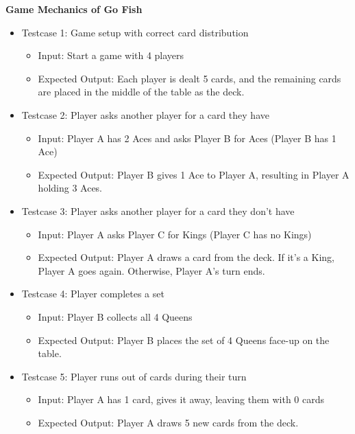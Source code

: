 \noindent
\textbf{Game Mechanics of Go Fish}
\begin{itemize}
    \item Testcase 1: Game setup with correct card distribution
    \begin{itemize}
        \item Input: Start a game with 4 players
        \item Expected Output: Each player is dealt 5 cards, and the remaining cards are placed in the middle of the table as the deck.
    \end{itemize}

    \item Testcase 2: Player asks another player for a card they have
    \begin{itemize}
        \item Input: Player A has 2 Aces and asks Player B for Aces (Player B has 1 Ace)
        \item Expected Output: Player B gives 1 Ace to Player A, resulting in Player A holding 3 Aces.
    \end{itemize}

    \item Testcase 3: Player asks another player for a card they don’t have
    \begin{itemize}
        \item Input: Player A asks Player C for Kings (Player C has no Kings)
        \item Expected Output: Player A draws a card from the deck. If it’s a King, Player A goes again. Otherwise, Player A's turn ends.
    \end{itemize}

    \item Testcase 4: Player completes a set
    \begin{itemize}
        \item Input: Player B collects all 4 Queens
        \item Expected Output: Player B places the set of 4 Queens face-up on the table.
    \end{itemize}

    \item Testcase 5: Player runs out of cards during their turn
    \begin{itemize}
        \item Input: Player A has 1 card, gives it away, leaving them with 0 cards
        \item Expected Output: Player A draws 5 new cards from the deck.
    \end{itemize}


\end{itemize}
